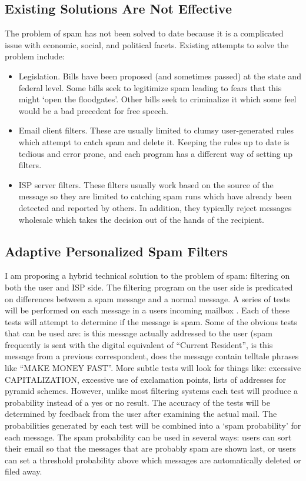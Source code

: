 \subsection{Existing Solutions Are Not Effective}
The problem of spam has not been solved to date because it is a complicated
issue with economic, social, and political facets. Existing attempts to solve
the problem include:

\begin{itemize}
\item Legislation. Bills have been proposed (and sometimes passed) at the state
  and federal level. Some bills seek to legitimize spam leading to fears that
  this might `open the floodgates'. Other bills seek to criminalize it which
  some feel would be a bad precedent for free speech.
\item Email client filters. These are usually limited to clumsy user-generated
  rules which attempt to catch spam and delete it. Keeping the rules up to date
  is tedious and error prone, and each program has a different way of setting
  up filters.
\item ISP server filters. These filters usually work based on the source of the
  message so they are limited to catching spam runs which have already been
  detected and reported by others. In addition, they typically reject messages
  wholesale which takes the decision out of the hands of the recipient.
\end{itemize}

\subsection{Adaptive Personalized Spam Filters}
I am proposing a hybrid technical solution to the problem of spam: filtering on
both the user and ISP side. The filtering program on the user side is
predicated on differences between a spam message and a normal message. A series
of tests will be performed on each message in a users incoming mailbox . Each
of these tests will attempt to determine if the message is spam. Some of the
obvious tests that can be used are: is this message actually addressed to the
user (spam frequently is sent with the digital equivalent of ``Current
Resident'', is this message from a previous correspondent, does the message
contain telltale phrases like ``MAKE MONEY FAST''. More subtle tests will look
for things like: excessive CAPITALIZATION, excessive use of exclamation points,
lists of addresses for pyramid schemes. However, unlike most filtering systems
each test will produce a probability instead of a yes or no result. The
accuracy of the tests will be determined by feedback from the user after
examining the actual mail. The probabilities generated by each test will be
combined into a `spam probability' for each message. The spam probability can
be used in several ways: users can sort their email so that the messages that
are probably spam are shown last, or users can set a threshold probability
above which messages are automatically deleted or filed away.

